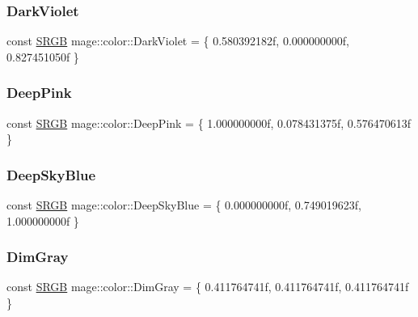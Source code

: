 \subsubsection{\texorpdfstring{Dark\+Violet}{DarkViolet}}
{\footnotesize\ttfamily const \hyperlink{structmage_1_1_s_r_g_b}{S\+R\+GB} mage\+::color\+::\+Dark\+Violet = \{ 0.\+580392182f, 0.\+000000000f, 0.\+827451050f \}}

\hypertarget{namespacemage_1_1color_a2f32949f29b73476666817a1fab57474}{}\label{namespacemage_1_1color_a2f32949f29b73476666817a1fab57474} 
\subsubsection{\texorpdfstring{Deep\+Pink}{DeepPink}}
{\footnotesize\ttfamily const \hyperlink{structmage_1_1_s_r_g_b}{S\+R\+GB} mage\+::color\+::\+Deep\+Pink = \{ 1.\+000000000f, 0.\+078431375f, 0.\+576470613f \}}

\hypertarget{namespacemage_1_1color_a34efa3932c85751d00d0e6643f0d2f02}{}\label{namespacemage_1_1color_a34efa3932c85751d00d0e6643f0d2f02} 
\subsubsection{\texorpdfstring{Deep\+Sky\+Blue}{DeepSkyBlue}}
{\footnotesize\ttfamily const \hyperlink{structmage_1_1_s_r_g_b}{S\+R\+GB} mage\+::color\+::\+Deep\+Sky\+Blue = \{ 0.\+000000000f, 0.\+749019623f, 1.\+000000000f \}}

\hypertarget{namespacemage_1_1color_a5936f7ed79e098da666268db498a91a9}{}\label{namespacemage_1_1color_a5936f7ed79e098da666268db498a91a9} 
\subsubsection{\texorpdfstring{Dim\+Gray}{DimGray}}
{\footnotesize\ttfamily const \hyperlink{structmage_1_1_s_r_g_b}{S\+R\+GB} mage\+::color\+::\+Dim\+Gray = \{ 0.\+411764741f, 0.\+411764741f, 0.\+411764741f \}}

\hypertarget{namespacemage_1_1color_a8705f2ef78eda639953af9102ef63503}{}\label{namespacemage_1_1color_a8705f2ef78eda639953af9102ef63503} 
